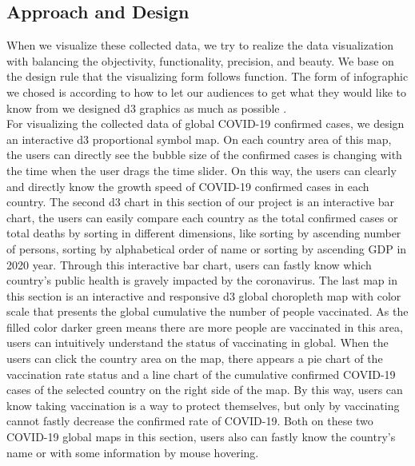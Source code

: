 \documentclass[runningheads]{llncs}
\begin{document}
\subsection{Approach and Design} 
When we visualize these collected data, we try to realize the data visualization with balancing the objectivity, functionality, precision, and beauty. We base on the design rule that the visualizing form follows function. The form of infographic we chosed is according to how to let our audiences to get what they would like to know from we designed d3 graphics as much as possible \cite{albertocairo2012ggplot2}.\\
For visualizing the collected data of global COVID-19 confirmed cases, we design an interactive d3 proportional symbol map. On each country area of this map, the users can directly see the bubble size of the confirmed cases is changing with the time when the user drags the time slider. 
On this way, the users can clearly and directly know the growth speed of COVID-19 confirmed cases in each country. The second d3 chart in this section of our project is an interactive bar chart, the users can easily compare each country as the total confirmed cases or total deaths by sorting in different dimensions, like sorting by ascending number of persons, sorting by alphabetical order of name or sorting by ascending GDP in 2020 year. 
Through this interactive bar chart, users can fastly know which country’s public health is gravely impacted by the coronavirus. The last map in this section is an interactive and responsive d3 global choropleth map with color scale that presents the global cumulative the number of people vaccinated. 
As the filled color darker green means there are more people are vaccinated in this area, users can intuitively understand the status of vaccinating in global. When the users can click the country area on the map, there appears a pie chart of the vaccination rate status and a line chart of the cumulative confirmed COVID-19 cases of the selected country on the right side of the map. By this way, users can know taking vaccination is a way to protect themselves, but only by vaccinating cannot fastly decrease the confirmed rate of COVID-19.
Both on these two COVID-19 global maps in this section, users also can fastly know the country’s name or with some information by mouse hovering. 
\end{document}
